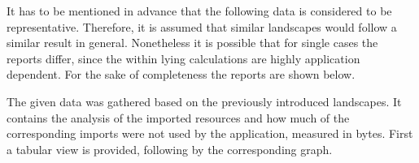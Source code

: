 It has to be mentioned in advance that the following data is considered to be representative. Therefore, it is assumed that similar landscapes would follow a similar result in general. Nonetheless it is possible that for single cases the reports differ, since the within lying calculations are highly application dependent.
For the sake of completeness the reports are shown below.

The given data was gathered based on the previously introduced landscapes. It contains the analysis of the imported resources and how much of the corresponding imports were not used by the application, measured in bytes. First a tabular view is provided, following by the corresponding graph.

\newpage

\scriptsize 
\setlength{\mycolwidthtwo}{\dimexpr \textwidth/5 - 2\tabcolsep}%

